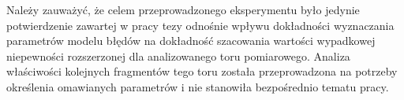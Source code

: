 Należy zauważyć, że celem przeprowadzonego eksperymentu było jedynie potwierdzenie zawartej w pracy tezy odnośnie wpływu dokładności wyznaczania parametrów modelu błędów na dokładność szacowania wartości wypadkowej niepewności rozszerzonej dla analizowanego toru pomiarowego. Analiza właściwości kolejnych fragmentów tego toru została przeprowadzona na potrzeby określenia omawianych parametrów i nie stanowiła bezpośrednio tematu pracy.
